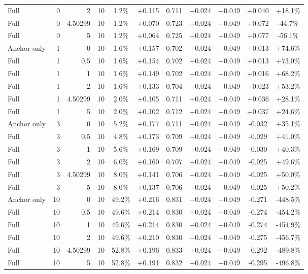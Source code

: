 \begin{table}[htbp]
\begin{tabular}{lrrrccccccc}
Full & 0 & 2 & 10 & 1.2\% & +0.115 & 0.711 & +0.024 & +0.049 & +0.040 & +18.1\% \\
Full & 0 & 4.50299 & 10 & 1.2\% & +0.070 & 0.723 & +0.024 & +0.049 & +0.072 & -44.7\% \\
Full & 0 & 5 & 10 & 1.2\% & +0.064 & 0.725 & +0.024 & +0.049 & +0.077 & -56.1\% \\
Anchor only & 1 & 0 & 10 & 1.6\% & +0.157 & 0.702 & +0.024 & +0.049 & +0.013 & +74.6\% \\
Full & 1 & 0.5 & 10 & 1.6\% & +0.154 & 0.702 & +0.024 & +0.049 & +0.013 & +73.0\% \\
Full & 1 & 1 & 10 & 1.6\% & +0.149 & 0.702 & +0.024 & +0.049 & +0.016 & +68.2\% \\
Full & 1 & 2 & 10 & 1.6\% & +0.133 & 0.704 & +0.024 & +0.049 & +0.023 & +53.2\% \\
Full & 1 & 4.50299 & 10 & 2.0\% & +0.105 & 0.711 & +0.024 & +0.049 & +0.036 & +28.1\% \\
Full & 1 & 5 & 10 & 2.0\% & +0.102 & 0.712 & +0.024 & +0.049 & +0.037 & +24.6\% \\
Anchor only & 3 & 0 & 10 & 5.2\% & +0.177 & 0.711 & +0.024 & +0.049 & -0.032 & +35.1\% \\
Full & 3 & 0.5 & 10 & 4.8\% & +0.173 & 0.709 & +0.024 & +0.049 & -0.029 & +41.0\% \\
Full & 3 & 1 & 10 & 5.6\% & +0.169 & 0.709 & +0.024 & +0.049 & -0.030 & +40.3\% \\
Full & 3 & 2 & 10 & 6.0\% & +0.160 & 0.707 & +0.024 & +0.049 & -0.025 & +49.6\% \\
Full & 3 & 4.50299 & 10 & 8.0\% & +0.141 & 0.706 & +0.024 & +0.049 & -0.025 & +50.0\% \\
Full & 3 & 5 & 10 & 8.0\% & +0.137 & 0.706 & +0.024 & +0.049 & -0.025 & +50.2\% \\
Anchor only & 10 & 0 & 10 & 49.2\% & +0.216 & 0.831 & +0.024 & +0.049 & -0.271 & -448.5\% \\
Full & 10 & 0.5 & 10 & 49.6\% & +0.214 & 0.830 & +0.024 & +0.049 & -0.274 & -454.2\% \\
Full & 10 & 1 & 10 & 49.6\% & +0.214 & 0.830 & +0.024 & +0.049 & -0.274 & -454.9\% \\
Full & 10 & 2 & 10 & 49.6\% & +0.210 & 0.830 & +0.024 & +0.049 & -0.275 & -456.7\% \\
Full & 10 & 4.50299 & 10 & 52.8\% & +0.196 & 0.833 & +0.024 & +0.049 & -0.292 & -489.8\% \\
Full & 10 & 5 & 10 & 52.8\% & +0.191 & 0.832 & +0.024 & +0.049 & -0.295 & -496.8\% \\

\end{tabular}
\end{table}
